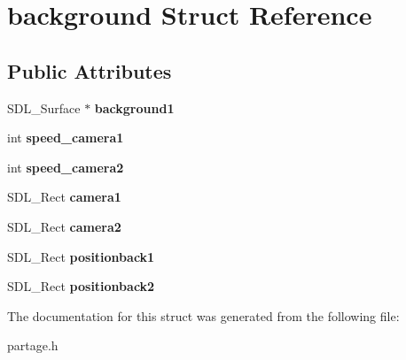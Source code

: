\hypertarget{structbackground}{}\section{background Struct Reference}
\label{structbackground}
\subsection*{Public Attributes}
\begin{DoxyCompactItemize}
\item 
\mbox{\label{structbackground_a71aceaee4e39742154ed8e14b585268d}} 
S\+D\+L\+\_\+\+Surface $\ast$ {\bfseries background1}
\item 
\mbox{\label{structbackground_a8343229d5bfe0a77e1dc4328a74a28b2}} 
int {\bfseries speed\+\_\+camera1}
\item 
\mbox{\label{structbackground_ac0024eb5667068ca7bdadfe44f0c4c25}} 
int {\bfseries speed\+\_\+camera2}
\item 
\mbox{\label{structbackground_aa3d478f8fe731ff1cfd6c8734df178eb}} 
S\+D\+L\+\_\+\+Rect {\bfseries camera1}
\item 
\mbox{\label{structbackground_a12cff42693f13c5bbdfd16394eedfdee}} 
S\+D\+L\+\_\+\+Rect {\bfseries camera2}
\item 
\mbox{\label{structbackground_a786f5b1835eebbf99c93c50ff94fa164}} 
S\+D\+L\+\_\+\+Rect {\bfseries positionback1}
\item 
\mbox{\label{structbackground_a2723e14d4ecb31ac91701cc202283cc4}} 
S\+D\+L\+\_\+\+Rect {\bfseries positionback2}
\end{DoxyCompactItemize}


The documentation for this struct was generated from the following file\+:\begin{DoxyCompactItemize}
\item 
partage.\+h\end{DoxyCompactItemize}
